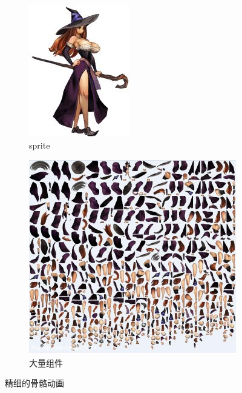 \documentclass[twocolumn,11pt]{ctexart}
\begin{document}
\begin{figure}[htb]
    \centering
    \begin{subfigure}[b]{0.4\linewidth}
      \includegraphics[width=\linewidth]{witch.jpg}
      \caption{sprite}
    \end{subfigure}
    \begin{subfigure}[b]{0.4\linewidth}
      \includegraphics[width=\linewidth]{witch_c.jpg}
      \caption{大量组件}
    \end{subfigure}
    \caption{精细的骨骼动画}
    \label{fig:bones}
\end{figure}
\end{document}
